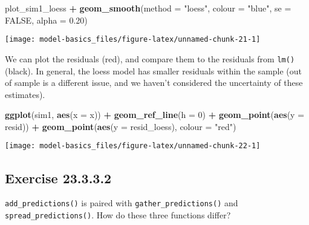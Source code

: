 \documentclass[]{book}
\newenvironment{Shaded}{\begin{snugshade}}{\end{snugshade}}
\newcommand{\DataTypeTok}[1]{\textcolor[rgb]{0.13,0.29,0.53}{#1}}
\newcommand{\DecValTok}[1]{\textcolor[rgb]{0.00,0.00,0.81}{#1}}
\newcommand{\FloatTok}[1]{\textcolor[rgb]{0.00,0.00,0.81}{#1}}
\newcommand{\KeywordTok}[1]{\textcolor[rgb]{0.13,0.29,0.53}{\textbf{#1}}}
\newcommand{\NormalTok}[1]{#1}
\newcommand{\OperatorTok}[1]{\textcolor[rgb]{0.81,0.36,0.00}{\textbf{#1}}}
\newcommand{\OtherTok}[1]{\textcolor[rgb]{0.56,0.35,0.01}{#1}}
\newcommand{\StringTok}[1]{\textcolor[rgb]{0.31,0.60,0.02}{#1}}
\theoremstyle{plain}
\theoremstyle{remark}
\begin{document}
\begin{Shaded}
\begin{Highlighting}[]
\NormalTok{plot_sim1_loess }\OperatorTok{+}
\StringTok{  }\KeywordTok{geom_smooth}\NormalTok{(}\DataTypeTok{method =} \StringTok{"loess"}\NormalTok{, }\DataTypeTok{colour =} \StringTok{"blue"}\NormalTok{, }\DataTypeTok{se =} \OtherTok{FALSE}\NormalTok{, }\DataTypeTok{alpha =} \FloatTok{0.20}\NormalTok{)}
\end{Highlighting}
\end{Shaded}

\begin{center}\texttt{[image: model-basics\_files/figure-latex/unnamed-chunk-21-1]} \end{center}

We can plot the residuals (red), and compare them to the residuals from
\texttt{lm()} (black). In general, the loess model has smaller residuals
within the sample (out of sample is a different issue, and we haven't
considered the uncertainty of these estimates).

\begin{Shaded}
\begin{Highlighting}[]
\KeywordTok{ggplot}\NormalTok{(sim1, }\KeywordTok{aes}\NormalTok{(}\DataTypeTok{x =}\NormalTok{ x)) }\OperatorTok{+}
\StringTok{  }\KeywordTok{geom_ref_line}\NormalTok{(}\DataTypeTok{h =} \DecValTok{0}\NormalTok{) }\OperatorTok{+}
\StringTok{  }\KeywordTok{geom_point}\NormalTok{(}\KeywordTok{aes}\NormalTok{(}\DataTypeTok{y =}\NormalTok{ resid)) }\OperatorTok{+}
\StringTok{  }\KeywordTok{geom_point}\NormalTok{(}\KeywordTok{aes}\NormalTok{(}\DataTypeTok{y =}\NormalTok{ resid_loess), }\DataTypeTok{colour =} \StringTok{"red"}\NormalTok{)}
\end{Highlighting}
\end{Shaded}

\begin{center}\texttt{[image: model-basics\_files/figure-latex/unnamed-chunk-22-1]} \end{center}

\hypertarget{exercise-23.3.3.2}{%
\subsection*{\texorpdfstring{Exercise
{23.3.3.2}}{Exercise 23.3.3.2}}\label{exercise-23.3.3.2}}

\texttt{add\_predictions()} is paired with
\texttt{gather\_predictions()} and \texttt{spread\_predictions()}. How
do these three functions differ?
\end{document}
